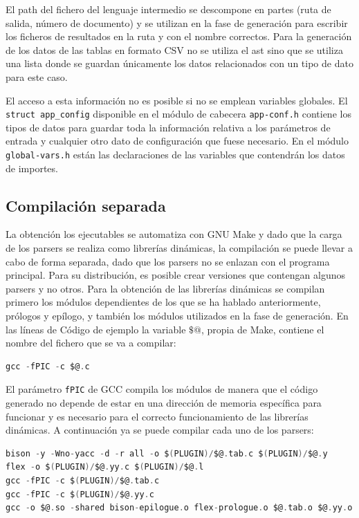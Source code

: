 El path del fichero del lenguaje intermedio se descompone en partes (ruta de salida, número de documento) y se utilizan en la fase de generación para escribir los ficheros de resultados en la ruta y con el nombre correctos. Para la generación de los datos de las tablas en formato CSV no se utiliza el \acrshort{ast} sino que se utiliza una lista donde se guardan únicamente los datos relacionados con un tipo de dato para este caso.

El acceso a esta información no es posible si no se emplean variables globales. El \verb|struct app_config| disponible en el módulo de cabecera \verb|app-conf.h| contiene los tipos de datos para guardar toda la información relativa a los parámetros de entrada y cualquier otro dato de configuración que fuese necesario. En el módulo \verb|global-vars.h| están las declaraciones de las variables que contendrán los datos de importes.

\subsection{Compilación separada}

La obtención los ejecutables se automatiza con GNU Make y dado que la carga de los parsers se realiza como librerías dinámicas, la compilación se puede llevar a cabo de forma separada, dado que los parsers no se enlazan con el programa principal. Para su distribución, es posible crear versiones que contengan algunos parsers y no otros.
Para la obtención de las librerías dinámicas se compilan primero los módulos dependientes de los que se ha hablado anteriormente, prólogos y epílogo, y también los módulos utilizados en la fase de generación. En las líneas de Código de ejemplo la variable $ \$@ $, propia de Make, contiene el nombre del fichero que se va a compilar:

\begin{lstlisting}[language=C,caption={},label={}]
gcc -fPIC -c $@.c
\end{lstlisting}

El parámetro \verb|fPIC| de GCC compila los módulos de manera que el código generado no depende de estar en una dirección de memoria específica para funcionar y es necesario para el correcto funcionamiento de las librerías dinámicas. A continuación ya se puede compilar cada uno de los parsers:

\begin{lstlisting}[language=C,caption={},label={}]
bison -y -Wno-yacc -d -r all -o $(PLUGIN)/$@.tab.c $(PLUGIN)/$@.y
flex -o $(PLUGIN)/$@.yy.c $(PLUGIN)/$@.l
gcc -fPIC -c $(PLUGIN)/$@.tab.c
gcc -fPIC -c $(PLUGIN)/$@.yy.c
gcc -o $@.so -shared bison-epilogue.o flex-prologue.o $@.tab.o $@.yy.o
\end{lstlisting}

